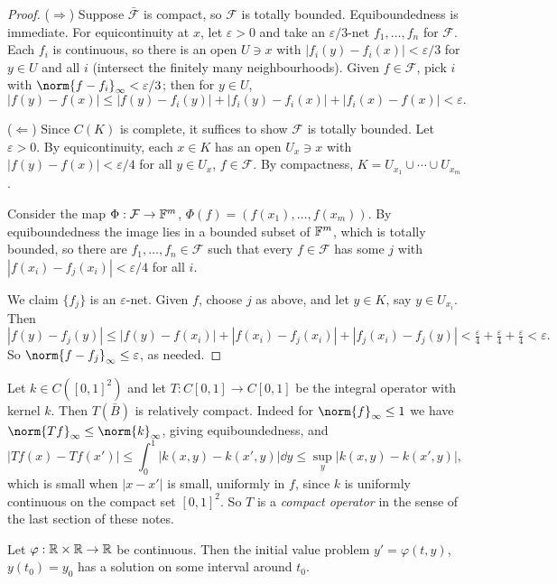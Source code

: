 \documentclass[a4paper]{scrartcl}
\begin{document}
\begin{proof}
	($\Rightarrow$) Suppose $\bar{\mathcal F}$ is compact, so $\mathcal F$ is totally bounded. Equiboundedness is immediate. For equicontinuity at $x$, let $\varepsilon>0$ and take an $\varepsilon/3$-net $f_1,\dots,f_n$ for $\mathcal{F}$. Each $f_i$ is continuous, so there is an open $U \ni x$ with $|f_i(y)-f_i(x)| < \varepsilon/3$ for $y \in U$ and all $i$ (intersect the finitely many neighbourhoods). Given $f \in \mathcal F$, pick $i$ with $\norm{f - f_i}_\infty < \varepsilon/3$; then for $y \in U$,
	$$|f(y)-f(x)| \leq |f(y)-f_i(y)| + |f_i(y)-f_i(x)| + |f_i(x)-f(x)| < \varepsilon.$$

	($\Leftarrow$) Since $C(K)$ is complete, it suffices to show $\mathcal F$ is totally bounded. Let $\varepsilon > 0$. By equicontinuity, each $x \in K$ has an open $U_x \ni x$ with $|f(y)-f(x)| < \varepsilon/4$ for all $y \in U_x$, $f \in \mathcal{F}$. By compactness, $K = U_{x_1}\cup\cdots\cup U_{x_m}$.

	Consider the map $\Phi : \mathcal{F} \to \mathbb{F}^m$, $\Phi(f) = (f(x_1),\dots,f(x_m))$. By equiboundedness the image lies in a bounded subset of $\mathbb{F}^m$, which is totally bounded, so there are $f_1, \dots, f_n \in \mathcal{F}$ such that every $f \in \mathcal{F}$ has some $j$ with $|f(x_i) - f_j(x_i)| < \varepsilon/4$ for all $i$.

	We claim $\{f_j\}$ is an $\varepsilon$-net. Given $f$, choose $j$ as above, and let $y \in K$, say $y \in U_{x_i}$. Then
	$$|f(y)-f_j(y)| \leq |f(y)-f(x_i)| + |f(x_i)-f_j(x_i)| + |f_j(x_i)-f_j(y)| < \tfrac\varepsilon4+\tfrac\varepsilon4+\tfrac\varepsilon4 < \varepsilon.$$
	So $\norm{f - f_j}_\infty \leq \varepsilon$, as needed.
\end{proof}

\begin{example}
	Let $k \in C([0,1]^2)$ and let $T : C[0,1]\to C[0,1]$ be the integral operator with kernel $k$. Then $T(\bar B)$ is relatively compact. Indeed for $\norm{f}_\infty \leq 1$ we have $\norm{Tf}_\infty \leq \norm{k}_\infty$, giving equiboundedness, and
	$$|Tf(x) - Tf(x')| \leq \int_0^1 |k(x,y)-k(x',y)|\dd y \leq \sup_y |k(x,y)-k(x',y)|,$$
	which is small when $|x - x'|$ is small, uniformly in $f$, since $k$ is uniformly continuous on the compact set $[0,1]^2$. So $T$ is a \emph{compact operator} in the sense of the last section of these notes.
\end{example}

\begin{theorem}
	Let $\varphi : \mathbb{R} \times \mathbb{R} \to \mathbb{R}$ be continuous. Then the initial value problem $y' = \varphi(t,y)$, $y(t_0) = y_0$ has a solution on some interval around $t_0$.
\end{theorem}
\end{document}
